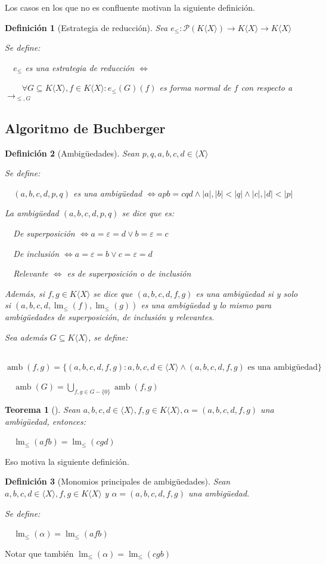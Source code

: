 \documentclass{amsbook}
\theoremstyle{customstyle}
\newtheorem{definition}{Definición}[section]
\newtheorem{theorem}{Teorema}[section]
\newcommand{\definición}[2][]{
  \begin{definition}[#1]
  \setlength{\parindent}{2em} %
  #2
  \end{definition}
}
\newcommand{\teorema}[2][]{
  \begin{theorem}[#1]
  \setlength{\parindent}{2em} %
  #2
  \end{theorem}
}
\DeclareMathOperator{\lm}{lm}
\DeclareMathOperator{\amb}{amb}
\begin{document}
Los casos en los que no es confluente motivan la siguiente definición.

\definición[Estrategia de reducción] {
Sea $e_≤ : 𝒫(K⟨X⟩) → K⟨X⟩ → K⟨X⟩$

Se define:

  $e_≤$ es una estrategia de reducción $⇔$

    $∀G ⊆ K⟨X⟩, f ∈ K⟨X⟩ : e_≤(G)(f)$ es forma normal de $f$ con respecto a $→_{≤, G}$

}


\subsection{Algoritmo de Buchberger}

\definición[Ambigüedades] {
Sean $p, q, a, b, c, d ∈ ⟨X⟩$

Se define:

  $(a, b, c, d, p, q)$ es una ambigüedad $ ⇔ apb = cqd ∧ |a|, |b| < |q| ∧ |c|, |d| < |p|$

La ambigüedad $(a, b, c, d, p, q)$ se dice que es:

  De superposición $⇔ a = ε = d ∨ b = ε = c$

  De inclusión $⇔ a = ε = b ∨ c = ε = d$

  Relevante $⇔$ es de superposición o de inclusión

Además, si $f, g ∈ K⟨X⟩$ se dice que $(a, b, c, d, f, g)$ es una ambigüedad si y solo si $(a, b, c, d, \lm_≤{(f)}, \lm_≤{(g)})$ es una ambigüedad y lo mismo para ambigüedades de superposición, de inclusión y relevantes.

Sea además $G ⊆ K⟨X⟩$, se define:

  $\amb(f, g) = \{(a, b, c, d, f, g) : a, b, c, d ∈ ⟨X⟩ ∧ (a, b, c, d, f, g)\text{ es una ambigüedad}\}$

  $\amb(G) = \bigcup_{f, g ∈ G - \{0\}}{\amb(f, g)}$

}

\teorema[]{
Sean $a, b, c, d ∈ ⟨X⟩, f, g ∈ K⟨X⟩, α = (a, b, c, d, f, g)$ una ambigüedad, entonces:

  $\lm_≤{(afb)} = \lm_≤{(cgd)}$

}


Eso motiva la siguiente definición.

\definición[Monomios principales de ambigüedades] {
Sean $a, b, c, d ∈ ⟨X⟩, f, g ∈ K⟨X⟩$ y $α = (a, b, c, d, f, g)$ una ambigüedad.

Se define:

  $\lm_≤{(α)} = \lm_≤{(afb)}$
}
Notar que también $\lm_≤{(α)} = \lm_≤{(cgb)}$ %
\end{document}
